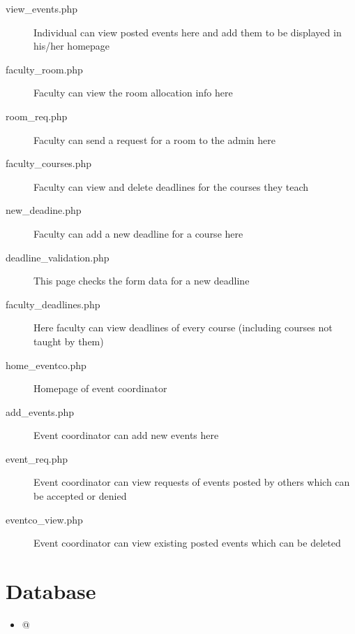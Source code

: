 \documentclass{article}
\begin{document}
\begin{description}
\item[view\_events.php] Individual can view posted events here and add them to be displayed in his/her homepage
\item[faculty\_room.php] Faculty can view the room allocation info here
\item[room\_req.php] Faculty can send a request for a room to the admin here
\item[faculty\_courses.php] Faculty can view and delete deadlines for the courses they teach
\item[new\_deadine.php] Faculty can add a new deadline for a course here
\item[deadline\_validation.php] This page checks the form data for a new deadline
\item[faculty\_deadlines.php] Here faculty can view deadlines of every course (including courses not taught by them)
\item[home\_eventco.php] Homepage of event coordinator
\item[add\_events.php] Event coordinator can add new events here
\item[event\_req.php] Event coordinator can view requests of events posted by others which can be accepted or denied
\item[eventco\_view.php] Event coordinator can view existing posted events which can be deleted
\end{description}

\section{Database}
\begin{itemize}
    \item @
\end{itemize}
\end{document}
